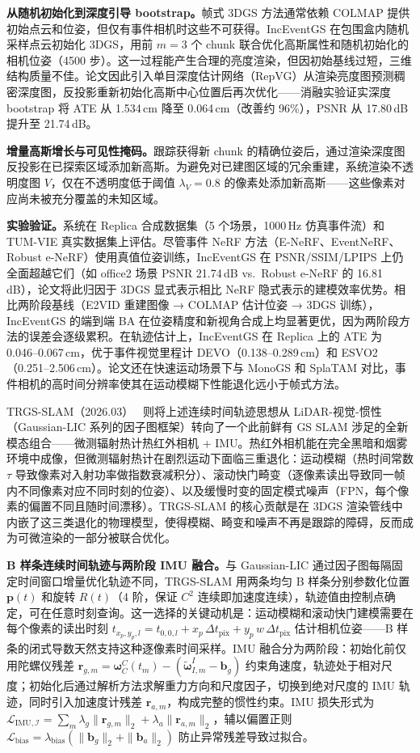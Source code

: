 \textbf{从随机初始化到深度引导 bootstrap。}帧式 3DGS 方法通常依赖 COLMAP 提供初始点云和位姿，但仅有事件相机时这些不可获得。IncEventGS 在包围盒内随机采样点云初始化 3DGS，用前 $m{=}3$ 个 chunk 联合优化高斯属性和随机初始化的相机位姿（4500 步）。这一过程能产生合理的亮度渲染，但因初始基线过短，三维结构质量不佳。论文因此引入单目深度估计网络（RepVG）从渲染亮度图预测稠密深度图，反投影重新初始化高斯中心位置后再次优化——消融实验证实深度 bootstrap 将 ATE 从 1.534\,cm 降至 0.064\,cm（改善约 96\%），PSNR 从 17.80\,dB 提升至 21.74\,dB。

\textbf{增量高斯增长与可见性掩码。}跟踪获得新 chunk 的精确位姿后，通过渲染深度图反投影在已探索区域添加新高斯。为避免对已建图区域的冗余重建，系统渲染不透明度图 $V$，仅在不透明度低于阈值 $\lambda_V{=}0.8$ 的像素处添加新高斯——这些像素对应尚未被充分覆盖的未知区域。

\textbf{实验验证。}系统在 Replica 合成数据集（5 个场景，1000\,Hz 仿真事件流）和 TUM-VIE 真实数据集上评估。尽管事件 NeRF 方法（E-NeRF、EventNeRF、Robust e-NeRF）使用真值位姿训练，IncEventGS 在 PSNR/SSIM/LPIPS 上仍全面超越它们（如 office2 场景 PSNR 21.74\,dB vs.\ Robust e-NeRF 的 16.81\,dB），论文将此归因于 3DGS 显式表示相比 NeRF 隐式表示的建模效率优势。相比两阶段基线（E2VID 重建图像 → COLMAP 估计位姿 → 3DGS 训练），IncEventGS 的端到端 BA 在位姿精度和新视角合成上均显著更优，因为两阶段方法的误差会逐级累积。在轨迹估计上，IncEventGS 在 Replica 上的 ATE 为 0.046--0.067\,cm，优于事件视觉里程计 DEVO（0.138--0.289\,cm）和 ESVO2（0.251--2.506\,cm）。论文还在快速运动场景下与 MonoGS 和 SplaTAM 对比，事件相机的高时间分辨率使其在运动模糊下性能退化远小于帧式方法。

TRGS-SLAM（2026.03）~\cite{2603_20443} 则将上述连续时间轨迹思想从 LiDAR-视觉-惯性（Gaussian-LIC 系列的因子图框架）转向了一个此前鲜有 GS SLAM 涉足的全新模态组合——微测辐射热计热红外相机 + IMU。热红外相机能在完全黑暗和烟雾环境中成像，但微测辐射热计在剧烈运动下面临三重退化：运动模糊（热时间常数 $\tau$ 导致像素对入射功率做指数衰减积分）、滚动快门畸变（逐像素读出导致同一帧内不同像素对应不同时刻的位姿）、以及缓慢时变的固定模式噪声（FPN，每个像素的偏置不同且随时间漂移）。TRGS-SLAM 的核心贡献是在 3DGS 渲染管线中内嵌了这三类退化的物理模型，使得模糊、畸变和噪声不再是跟踪的障碍，反而成为可微渲染的一部分被联合优化。

\textbf{B 样条连续时间轨迹与两阶段 IMU 融合。}与 Gaussian-LIC 通过因子图每隔固定时间窗口增量优化轨迹不同，TRGS-SLAM 用两条均匀 B 样条分别参数化位置 $\mathbf{p}(t)$ 和旋转 $R(t)$（4 阶，保证 $C^2$ 连续即加速度连续），轨迹值由控制点确定，可在任意时刻查询。这一选择的关键动机是：运动模糊和滚动快门建模需要在每个像素的读出时刻 $t_{x_p,y_p,l} = t_{0,0,l} + x_p\,\Delta t_\text{pix} + y_p\,w\,\Delta t_\text{pix}$ 估计相机位姿——B 样条的闭式导数天然支持这种逐像素时间采样。IMU 融合分为两阶段：初始化前仅用陀螺仪残差 $\mathbf{r}_{g,m} = \boldsymbol{\omega}_C^C(t_m) - (\tilde{\boldsymbol{\omega}}_{I,m}^I - \mathbf{b}_g)$ 约束角速度，轨迹处于相对尺度；初始化后通过解析方法求解重力方向和尺度因子，切换到绝对尺度的 IMU 轨迹，同时引入加速度计残差 $\mathbf{r}_{a,m}$，构成完整的惯性约束。IMU 损失形式为 $\mathcal{L}_{\text{IMU},\mathcal{I}} = \sum_m \lambda_g\|\mathbf{r}_{g,m}\|_2 + \lambda_a\|\mathbf{r}_{a,m}\|_2$，辅以偏置正则 $\mathcal{L}_\text{bias} = \lambda_\text{bias}(\|\mathbf{b}_g\|_2 + \|\mathbf{b}_a\|_2)$ 防止异常残差导致过拟合。

